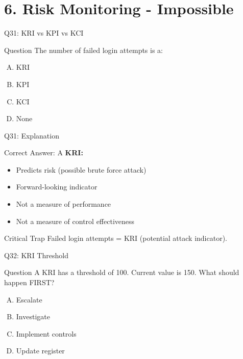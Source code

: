 \documentclass{beamer}
\begin{document}
			\section{6. Risk Monitoring - Impossible}
			\begin{frame}{Q31: KRI vs KPI vs KCI}
				\begin{block}{Question}
					The number of failed login attempts is a:
				\end{block}
				\begin{enumerate}[(A)]
					\item KRI
					\item KPI
					\item KCI
					\item None
				\end{enumerate}
			\end{frame}
			
			\begin{frame}{Q31: Explanation}
				\begin{block}{Correct Answer: A}
					\textbf{KRI:}
					\begin{itemize}
						\item Predicts risk (possible brute force attack)
						\item Forward-looking indicator
						\item Not a measure of performance
						\item Not a measure of control effectiveness
					\end{itemize}
				\end{block}
				\begin{alertblock}{Critical Trap}
					Failed login attempts = KRI (potential attack indicator).
				\end{alertblock}
			\end{frame}
			
			\begin{frame}{Q32: KRI Threshold}
				\begin{block}{Question}
					A KRI has a threshold of 100. Current value is 150. What should happen FIRST?
				\end{block}
				\begin{enumerate}[(A)]
					\item Escalate
					\item Investigate
					\item Implement controls
					\item Update register
				\end{enumerate}
			\end{frame}
			
\end{document}
